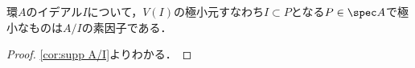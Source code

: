 \begin{cor}\label{cor:min V(I)はass(A/I)の元}
	環$A$のイデアル$I$について，$V(I)$の極小元すなわち$I\subset P$となる$P\in\spec A$で極小なものは$A/I$の素因子である．
\end{cor}

\begin{proof}
	\ref{cor:supp A/I}よりわかる．
\end{proof}

%
%

